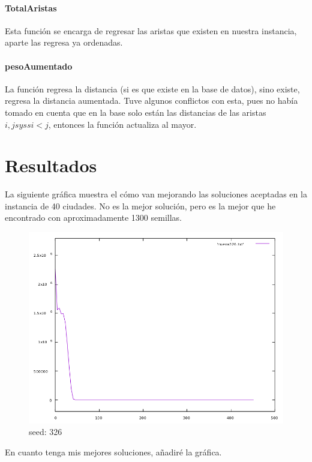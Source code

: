 \documentclass[
10pt,
a4paper,
oneside,
headinclude,footinclude,
BCOR5mm,
]{article}
\begin{document}
\paragraph{TotalAristas} Esta función se encarga de regresar las aristas que
existen en nuestra instancia, aparte las regresa ya ordenadas.

\paragraph{pesoAumentado} La función regresa la distancia (si es que existe en la
base de datos), sino existe, regresa la distancia aumentada. Tuve algunos
conflictos con esta, pues no había tomado en cuenta que en la base solo están las
distancias de las aristas $i,j syss i < j$, entonces la función actualiza al
mayor.

\section{Resultados}
La siguiente gráfica muestra el cómo van mejorando las soluciones aceptadas en la
instancia de 40 ciudades. No es la mejor solución, pero es la mejor que he encontrado
con aproximadamente 1300 semillas.\\

\begin{figure}[htbp]
    \centering
    \includegraphics[scale=.5]{../imagenes/seed326.png}
    \caption{seed: 326}
\end{figure}
En cuanto tenga mis mejores soluciones, añadiré la gráfica.
\end{document}
